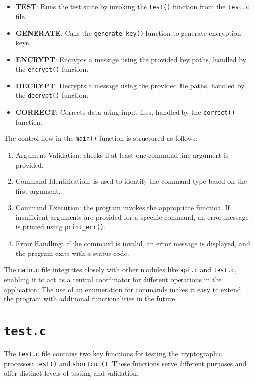 \begin{itemize}
    \item \textbf{TEST}: Runs the test suite by invoking the \texttt{test()} function from the \texttt{test.c} file.
    \item \textbf{GENERATE}: Calls the \texttt{generate\_key()} function to generate encryption keys.
    \item \textbf{ENCRYPT}: Encrypts a message using the provided key paths, handled by the \texttt{encrypt()} function.
    \item \textbf{DECRYPT}: Decrypts a message using the provided file paths, handled by the \texttt{decrypt()} function.
    \item \textbf{CORRECT}: Corrects data using input files, handled by the \texttt{correct()} function.
\end{itemize}

The control flow in the \texttt{main()} function is structured as follows:

\begin{enumerate}
    \item Argument Validation: checks if at least one command-line argument is provided.
    \item Command Identification: is used to identify the command type based on the first argument.
    \item Command Execution: the program invokes the appropriate function. If insufficient arguments are provided for a specific command, an error message is printed using \texttt{print\_err()}.
    \item Error Handling: if the command is invalid, an error message is displayed, and the program exits with a status code.
\end{enumerate}

The \texttt{main.c} file integrates closely with other modules like \texttt{api.c} and \texttt{test.c}, enabling it to act as a central coordinator for different operations in the application. The use of an enumeration for commands makes it easy to extend the program with additional functionalities in the future.

\section{\texttt{test.c}}

The \texttt{test.c} file contains two key functions for testing the cryptographic processes: \texttt{test()} and \texttt{shortcut()}. These functions serve different purposes and offer distinct levels of testing and validation.

